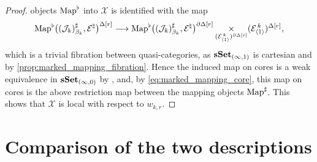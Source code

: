 \documentclass[10pt,reqno]{amsart}
\begin{document}
\begin{proof}
objects $\operatorname{Map}^\flat$ into $\mathcal X$ is identified with the map
\[
\operatorname{Map}^\flat\bigl((\mathcal J_k)^\sharp_{\beta_k},
                   \mathcal E^\natural\bigr)^{\Delta[r]}
\longrightarrow
\operatorname{Map}^\flat\bigl((\mathcal J_k)^\sharp_{\beta_k},
                   \mathcal E^\natural\bigr)^{\partial\Delta[r]}
\mathop{\times}_{(\mathcal E_{\langle1\rangle}^{\,k})^{\partial\Delta[r]}}
(\mathcal E_{\langle1\rangle}^{\,k})^{\Delta[r]},
\]
which is a trivial fibration between quasi-categories, as
$\mathbf{sSet}_{(\infty,1)}$ is cartesian and by
\cref{prop:marked_mapping_fibration}. Hence the induced map on cores
is a weak equivalence in $\mathbf{sSet}_{(\infty,0)}$ by
\cite[Lemma~3.1.3.2]{lurie2009higher}, and, by
\eqref{eq:marked_mapping_core}, this map on cores is the above
restriction map between the mapping objects $\operatorname{Map}^\sharp$. This
shows that $\mathcal X$ is local with respect to $w_{k,r}$.
\end{proof}

\section{Comparison of the two descriptions}
\label{sec:comparisons}
\end{document}
